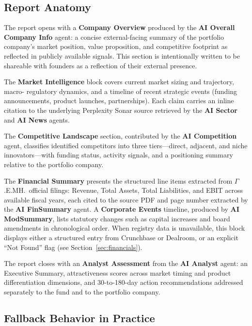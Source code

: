 \documentclass[12pt]{article}
\begin{document}
\subsection{Report Anatomy}

The report opens with a \textbf{Company Overview} produced by the \textbf{AI Overall Company Info}
agent: a concise external-facing summary of the portfolio company's market position, value
proposition, and competitive footprint as reflected in publicly available signals. This section is
intentionally written to be shareable with founders as a reflection of their external presence.

The \textbf{Market Intelligence} block covers current market sizing and trajectory, macro-
regulatory dynamics, and a timeline of recent strategic events (funding announcements, product
launches, partnerships). Each claim carries an inline citation to the underlying Perplexity Sonar
source retrieved by the \textbf{AI Sector} and \textbf{AI News} agents.

The \textbf{Competitive Landscape} section, contributed by the \textbf{AI Competition} agent,
classifies identified competitors into three tiers---direct, adjacent, and niche innovators---with
funding status, activity signals, and a positioning summary relative to the portfolio company.

The \textbf{Financial Summary} presents the structured line items extracted from $\Gamma$.E.MH.\
official filings: Revenue, Total Assets, Total Liabilities, and EBIT across available fiscal
years, each cited to the source PDF and page number extracted by the \textbf{AI FinSummary} agent.
A \textbf{Corporate Events} timeline, produced by \textbf{AI ModSummary}, lists statutory changes
such as capital increases and board amendments in chronological order. When registry data is
unavailable, this block displays either a structured entry from Crunchbase or Dealroom, or an
explicit ``Not Found'' flag (see Section~\ref{sec:financials}).

The report closes with an \textbf{Analyst Assessment} from the \textbf{AI Analyst} agent:
an Executive Summary, attractiveness scores across market timing and product differentiation
dimensions, and 30-to-180-day action recommendations addressed separately to the fund and to the
portfolio company.

\subsection{Fallback Behavior in Practice}
\end{document}
